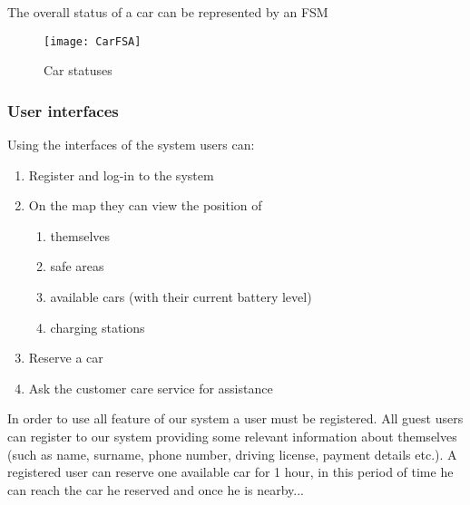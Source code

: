 	The overall status of a car can be represented by an FSM 
	\begin{figure}[h]
			\centering
			\texttt{[image: CarFSA]}
			\caption{
				\label{fig:carFSA} 
				Car statuses
			}
		\end{figure}
		
\subsubsection{User interfaces}
	Using the interfaces of the system users can:
	\begin{enumerate}
		\item Register and log-in to the system
		\item On the map they can view the position of
			\begin{enumerate}[label=\alph*)]
				\item themselves
				\item safe areas
				\item available cars (with their current battery level)
				\item charging stations
			\end{enumerate}
		\item Reserve a car
		\item Ask the customer care service for assistance 
	\end{enumerate}


	In order to use all feature of our system a user must be registered. All guest users can register to our system providing some relevant information about themselves (such as name, surname, phone number, driving license, payment details etc.). A registered user can reserve one available car for 1 hour, in this period of time he can reach the car he reserved and once he is nearby...

